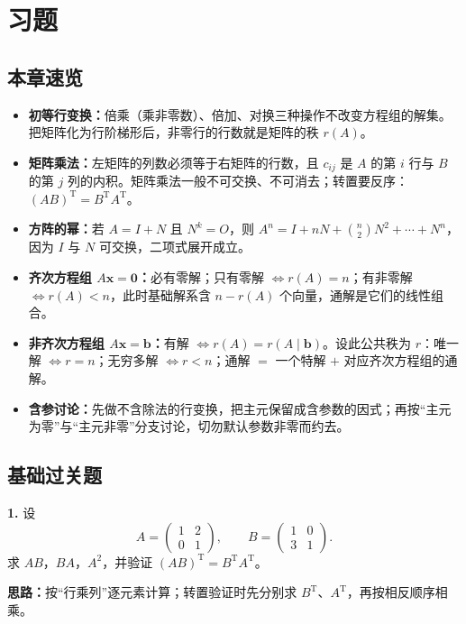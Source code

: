 \section{习题}

\subsection{本章速览}

\begin{itemize}
\item \textbf{初等行变换：}倍乘（乘非零数）、倍加、对换三种操作不改变方程组的解集。把矩阵化为行阶梯形后，非零行的行数就是矩阵的秩 \(r(A)\)。
\item \textbf{矩阵乘法：}左矩阵的列数必须等于右矩阵的行数，且 \(c_{ij}\) 是 \(A\) 的第 \(i\) 行与 \(B\) 的第 \(j\) 列的内积。矩阵乘法一般不可交换、不可消去；转置要反序：\((AB)^{\mathrm T}=B^{\mathrm T}A^{\mathrm T}\)。
\item \textbf{方阵的幂：}若 \(A=I+N\) 且 \(N^k=O\)，则 \(A^n=I+nN+\binom n2N^2+\cdots+N^n\)，因为 \(I\) 与 \(N\) 可交换，二项式展开成立。
\item \textbf{齐次方程组 \(A\boldsymbol x=\boldsymbol 0\)：}必有零解；只有零解 \(\iff r(A)=n\)；有非零解 \(\iff r(A)<n\)，此时基础解系含 \(n-r(A)\) 个向量，通解是它们的线性组合。
\item \textbf{非齐次方程组 \(A\boldsymbol x=\boldsymbol b\)：}有解 \(\iff r(A)=r(A\mid\boldsymbol b)\)。设此公共秩为 \(r\)：唯一解 \(\iff r=n\)；无穷多解 \(\iff r<n\)；通解 \(=\) 一个特解 \(+\) 对应齐次方程组的通解。
\item \textbf{含参讨论：}先做不含除法的行变换，把主元保留成含参数的因式；再按“主元为零”与“主元非零”分支讨论，切勿默认参数非零而约去。
\end{itemize}

\subsection{基础过关题}

\textbf{1.} 设
\[
A=\begin{pmatrix}1&2\\0&1\end{pmatrix},\qquad
B=\begin{pmatrix}1&0\\3&1\end{pmatrix}.
\]
求 \(AB\)，\(BA\)，\(A^2\)，并验证 \((AB)^{\mathrm T}=B^{\mathrm T}A^{\mathrm T}\)。

\ifshowsolutions%
\textbf{思路：}按“行乘列”逐元素计算；转置验证时先分别求 \(B^{\mathrm T}\)、\(A^{\mathrm T}\)，再按相反顺序相乘。

